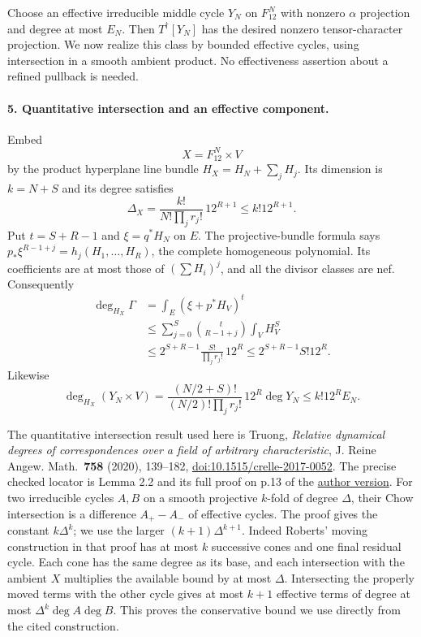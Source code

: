 Choose an effective irreducible middle cycle $Y_N$ on
$F_{12}^N$ with nonzero $\alpha$ projection and degree at
most $E_N$.  Then $T^\dagger[Y_N]$ has the desired nonzero
tensor-character projection.  We now realize this class by
bounded effective cycles, using intersection in a smooth
ambient product.  No effectiveness assertion about a refined
pullback is needed.

\paragraph{5. Quantitative intersection and an effective component.}
Embed
\[
 X=F_{12}^N\times V
\]
by the product hyperplane line bundle
$H_X=H_N+\sum_jH_j$.  Its dimension is $k=N+S$ and its
degree satisfies
\begin{equation}
 \Delta_X=\frac{k!}{N!\prod_jr_j!}\,12^{R+1}
                             \leq k!12^{R+1}.          \tag{N15.13}
\end{equation}
Put $t=S+R-1$ and $\xi=q^*H_N$ on $E$.
The projective-bundle formula says
$p_*\xi^{R-1+j}=h_j(H_1,\ldots,H_R)$, the complete
homogeneous polynomial.  Its coefficients are at most those
of $(\sum H_i)^j$, and all the divisor classes are nef.
Consequently
\begin{align*}
 \deg_{H_X}\Gamma
 &=\int_E(\xi+p^*H_V)^t\\
 &\leq\sum_{j=0}^S\binom{t}{R-1+j}\int_VH_V^S\\
 &\leq2^{S+R-1}\frac{S!}{\prod_jr_j!}\,12^R
 \leq2^{S+R-1}S!12^R.                              \tag{N15.14}
\end{align*}
Likewise
\begin{equation}
 \deg_{H_X}(Y_N\times V)
 =\frac{(N/2+S)!}{(N/2)!\prod_jr_j!}\,
                       12^R\deg Y_N
 \leq k!12^R E_N.                                  \tag{N15.15}
\end{equation}

The quantitative intersection result used here is Truong,
\emph{Relative dynamical degrees of correspondences over a
field of arbitrary characteristic}, J. Reine Angew. Math.\
\textbf{758} (2020), 139--182,
\href{https://doi.org/10.1515/crelle-2017-0052}
{doi:10.1515/crelle-2017-0052}.
The precise checked locator is Lemma 2.2 and its full proof
on p.13 of the
\href{https://arxiv.org/pdf/1605.05049}{author version}.
For two irreducible cycles $A,B$ on a smooth projective
$k$-fold of degree $\Delta$, their Chow intersection is a
difference $A_+-A_-$ of effective cycles.  The proof gives
the constant $k\Delta^k$; we use the larger
$(k+1)\Delta^{k+1}$.
Indeed Roberts' moving construction in that proof has at most
$k$ successive cones and one final residual cycle.  Each
cone has the same degree as its base, and each intersection
with the ambient $X$ multiplies the available bound by at
most $\Delta$.  Intersecting the properly moved terms with
the other cycle gives at most $k+1$ effective terms of degree
at most $\Delta^k\deg A\deg B$.
This proves the conservative bound we use directly from
the cited construction.

